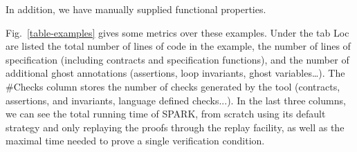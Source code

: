 \documentclass[runningheads]{llncs}
\begin{document}
%
In addition, we have manually supplied functional properties.

Fig.~\ref{table-examples} gives some metrics over these examples.
Under the tab Loc are listed the total number of lines of code in the example, the number of lines of specification (including contracts and specification functions), and the number of additional ghost annotations (assertions, loop invariants, ghost variables…). The \#Checks column stores the number of checks generated by the tool (contracts, assertions, and invariants, language defined checks...). In the last three columns, we can see the total running time of SPARK, from scratch using its default strategy and only replaying the proofs through the replay facility, as well as the maximal time needed to prove a single verification condition.
\end{document}

